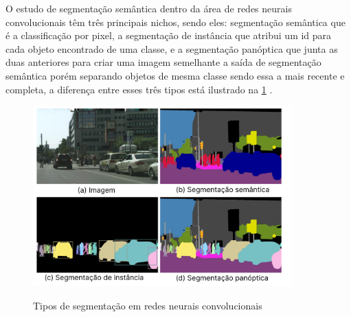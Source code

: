 \label{sec:segmentacao}

O estudo de segmentação semântica dentro da área de redes neurais convolucionais têm três principais nichos, sendo eles: segmentação semântica que é a classificação por pixel, a segmentação de instância que atribui um id para cada objeto encontrado de uma classe, e a segmentação panóptica que junta as duas anteriores para criar uma imagem semelhante a saída de segmentação semântica porém separando objetos de mesma classe sendo essa a mais recente e completa, a diferença entre esses três tipos está ilustrado na \cref{fig:segentacoes} \space\cite{dp_semantic_segmantation, lapix}.

\begin{figure}[ht]
	\caption{Tipos de segmentação em redes neurais convolucionais}
	\centering %
	\includegraphics[width=10cm]{figures/segmantations.png} %
	\label{fig:segentacoes}
\end{figure}



